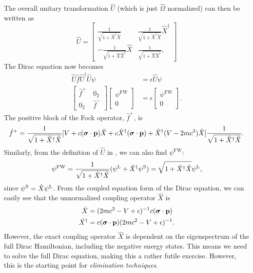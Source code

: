 \documentclass{article}
\begin{document}
The overall unitary transformation $\hat{U}$ (which is just $\hat{\Omega}$ normalized) can then be written as
\begin{equation}
\label{eq:fwtrans}
    \hat{U}=\begin{bmatrix}
        \frac{1}{\sqrt{1+\hat{ X }^{\dagger}\hat{ X }}} & \frac{1}{\sqrt{1+\hat{ X }^{\dagger}\hat{ X }}}\hat{ X }^{\dagger} \\
        -\frac{1}{\sqrt{1+\hat{ X }\hat{ X }^{\dagger}}}\hat{ X } & \frac{1}{\sqrt{1+\hat{ X }\hat{ X }^{\dagger}}},
    \end{bmatrix}
\end{equation}
The Dirac equation now becomes
\begin{align}
    \hat{U}\hat{f}\hat{U}^{\dagger}\hat{U}\psi&=\epsilon\hat{U}\psi\\
    \begin{bmatrix}
        \hat{f}^+\ & 0_2\\ 0_2 & \hat{f}^-
    \end{bmatrix}
    \begin{bmatrix}
        \psi^{\mathrm{FW}} \\ 0
    \end{bmatrix}
    &=\epsilon\begin{bmatrix}
        \psi^{\mathrm{FW}} \\ 0
    \end{bmatrix}.
\end{align}
The positive block of the Fock operator, $\hat{f}^+$, is
\begin{equation}
    \hat{f}^+=\frac{1}{\sqrt{1+\hat{ X }^{\dagger}\hat{ X } }}[V+c(\bm{\mathrm{\sigma}}\cdot\bm{\mathrm{p}})\hat{ X }+c\hat{ X }^{\dagger}(\bm{\mathrm{\sigma}}\cdot\bm{\mathrm{p}})+\hat{ X }^{\dagger}(V-2mc^2)\hat{ X } ]\frac{1}{\sqrt{1+\hat{ X }^{\dagger}\hat{ X } }}.
\end{equation}
Similarly, from the definition of $\hat{U}$ in , we can also find $\psi^{\mathrm{FW}}$:
\begin{equation}
    \psi^{\mathrm{FW}}=\frac{1}{\sqrt{1+\hat{ X }^{\dagger}\hat{ X }}}(\psi^{\mathrm{L}}+\hat{ X }^{\dagger}\psi^{\mathrm{S}})=\sqrt{1+\hat{ X }^{\dagger}\hat{ X }}\psi^{\mathrm{L}},
\end{equation}
since $\psi^{\mathrm{S}}=\hat{ X }\psi^{\mathrm{L}}$. From the coupled equation form of the Dirac equation, we can easily see that the unnormalized coupling operator $\hat{ X }$ is
\begin{align}
    \hat{ X }&=(2mc^2-V+\epsilon)^{-1}c(\bm{\mathrm{\sigma}}\cdot\bm{\mathrm{p}})\\
    \hat{ X }^{\dagger}&=c(\bm{\mathrm{\sigma}}\cdot\bm{\mathrm{p}})(2mc^2-V+\epsilon)^{-1}.
\end{align}
However, the exact coupling operator $\hat{ X }$ is dependent on the eigenspectrum of the full Dirac Hamiltonian, including the negative energy states. This means we need to solve the full Dirac equation, making this a rather futile exercise. However, this is the starting point for \textit{elimination techniques}.
\end{document}

